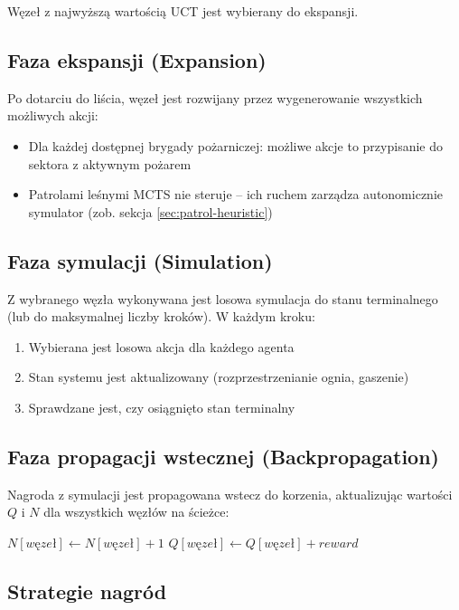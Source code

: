 \documentclass[11pt,a4paper]{article}
\begin{document}
Węzeł z najwyższą wartością UCT jest wybierany do ekspansji.

\subsection{Faza ekspansji (Expansion)}

Po dotarciu do liścia, węzeł jest rozwijany przez wygenerowanie wszystkich możliwych akcji:
\begin{itemize}
    \item Dla każdej dostępnej brygady pożarniczej: możliwe akcje to przypisanie do sektora z aktywnym pożarem
    \item Patrolami leśnymi MCTS nie steruje -- ich ruchem zarządza autonomicznie symulator (zob. sekcja \ref{sec:patrol-heuristic})
\end{itemize}

\subsection{Faza symulacji (Simulation)}

Z wybranego węzła wykonywana jest losowa symulacja do stanu terminalnego (lub do maksymalnej liczby kroków). W każdym kroku:
\begin{enumerate}
    \item Wybierana jest losowa akcja dla każdego agenta
    \item Stan systemu jest aktualizowany (rozprzestrzenianie ognia, gaszenie)
    \item Sprawdzane jest, czy osiągnięto stan terminalny
\end{enumerate}

\subsection{Faza propagacji wstecznej (Backpropagation)}

Nagroda z symulacji jest propagowana wstecz do korzenia, aktualizując wartości $Q$ i $N$ dla wszystkich węzłów na ścieżce:

\begin{algorithmic}
    \State $N[węzeł] \gets N[węzeł] + 1$
    \State $Q[węzeł] \gets Q[węzeł] + reward$
\EndFor
\end{algorithmic}

\subsection{Strategie nagród}
\end{document}
